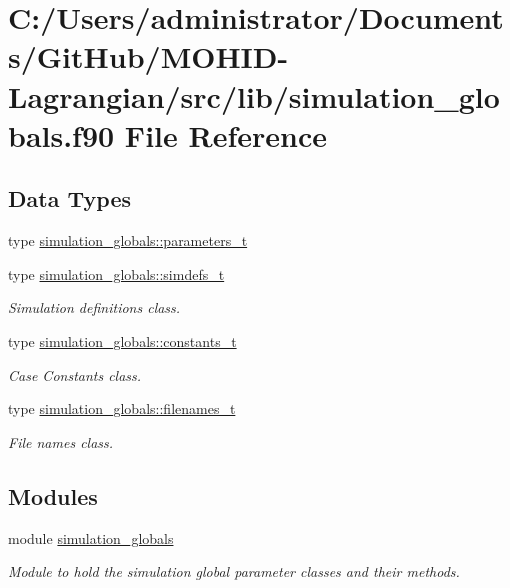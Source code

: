 \hypertarget{simulation__globals_8f90}{}\section{C\+:/\+Users/administrator/\+Documents/\+Git\+Hub/\+M\+O\+H\+I\+D-\/\+Lagrangian/src/lib/simulation\+\_\+globals.f90 File Reference}
\label{simulation__globals_8f90}
\subsection*{Data Types}
\begin{DoxyCompactItemize}
\item 
type \hyperlink{structsimulation__globals_1_1parameters__t}{simulation\+\_\+globals\+::parameters\+\_\+t}
\item 
type \hyperlink{structsimulation__globals_1_1simdefs__t}{simulation\+\_\+globals\+::simdefs\+\_\+t}
\begin{DoxyCompactList}\small\item\em Simulation definitions class. \end{DoxyCompactList}\item 
type \hyperlink{structsimulation__globals_1_1constants__t}{simulation\+\_\+globals\+::constants\+\_\+t}
\begin{DoxyCompactList}\small\item\em Case Constants class. \end{DoxyCompactList}\item 
type \hyperlink{structsimulation__globals_1_1filenames__t}{simulation\+\_\+globals\+::filenames\+\_\+t}
\begin{DoxyCompactList}\small\item\em File names class. \end{DoxyCompactList}\end{DoxyCompactItemize}
\subsection*{Modules}
\begin{DoxyCompactItemize}
\item 
module \hyperlink{namespacesimulation__globals}{simulation\+\_\+globals}
\begin{DoxyCompactList}\small\item\em Module to hold the simulation global parameter classes and their methods. \end{DoxyCompactList}\end{DoxyCompactItemize}
